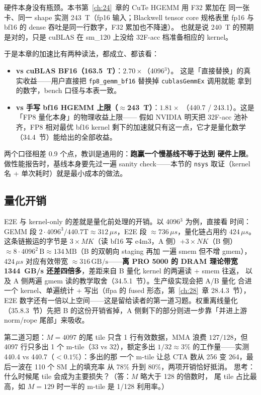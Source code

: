 硬件本身没有瓶颈。本书第~\ref{ch:24}~章的 CuTe HGEMM 用 F32 累加在
同一张卡、同一 shape 实测 243~T（fp16 输入；Blackwell tensor core
规格表里 fp16 与 bf16 的 dense 吞吐是同一行数字，F32 累加也不降速）。
也就是说 240~T 的预期是对的，只是 cuBLAS 在 sm\_120 上没给 32F-acc
档准备相应的 kernel。

于是本章的加速比有两种读法，都成立、都该看：

\begin{itemize}[itemsep=1pt,topsep=2pt]
  \item \textbf{vs cuBLAS BF16（163.5~T）}：$2.70\times$（4096$^3$）。
        这是「直接替换」的真实收益——用户直接把
        \texttt{fp8\_gemm\_bf16} 替换掉 \texttt{cublasGemmEx} 调用就能
        拿到的数字，bench 口径与本表一致。
  \item \textbf{vs 手写 bf16 HGEMM 上限（$\approx$243~T）}：$1.81\times$
        （440.7 / 243.1）。这是「FP8 量化本身」的物理收益上限——
        假如 NVIDIA 明天把 32F-acc 池补齐，FP8 相对最优 bf16 kernel
        剩下的加速就只有这一点，它才是量化数学（34.4~节）能给出的全部收益。
\end{itemize}

两个口径相差 0.9 个点，教训是通用的：\textbf{跑赢一个慢基线不等于达到
硬件上限}。做性能报告时，基线本身要先过一遍 sanity check——本节的
\texttt{nsys} 取证（kernel 名 + 单次耗时）就是最小成本的做法。

\subsection{量化开销}

E2E 与 kernel-only 的差就是量化前处理的开销。以 4096$^3$ 为例，直接看
时间：GEMM 段
$2\cdot4096^3/440.7\mathrm{T}\approx 312\,\mu s$，E2E 段
$\approx 736\,\mu s$，量化链占用约 $424\,\mu s$。这条链搬运的字节是
$3\times MK$（读 bf16 写 e4m3，A 侧）$+3\times NK$（B 侧）$\approx
8\cdot 4096^2\,\text{B}\approx 134\,\text{MB}$（B 的双朝向 staging 再加
一遍 smem 但不增 gmem），$424\,\mu s$ 对应有效带宽
$\approx 316\,\text{GB/s}$——\textbf{离 PRO 5000 的 DRAM 理论带宽
1344~GB/s 还差四倍多}，差距来自 B 量化 kernel 的两遍读 + smem 往返，
以及 A 侧两遍 gmem 读的教学取舍（34.5.1~节）。生产级实现会把 A/B 量化
合进一个 kernel、单遍统计 + 写出（ffpa 的 fused 形态，第~\ref{ch:28}~章
28.4.3~节），
E2E 数字还有一倍以上空间——这是留给读者的第一道习题。权重离线量化
（35.8.3~节）先把 B 的这份开销省掉，A 侧剩下的部分则进一步靠「并进上游
norm/rope 尾部」来吸收。

第二道习题：$M{=}4097$ 的尾 tile 只含 1 行有效数据，MMA 浪费
$127/128$，但 4097 行只多出 1 个 m-tile（33 vs 32），额定多出
$1/32\approx 3\%$ 的工作量——实测 440.4 vs 440.7（$<0.1\%$）：多出的那
一个 m-tile 让总 CTA 数从 256 变 264，最后一波在 110 个 SM 上的填充率
从 78\% 升到 80\%，两项开销恰好抵消。
思考：什么时候尾 tile 会成为主要损失？（答：$M$ 略大于 128 的倍数时，
尾 tile 占比最高，如 $M{=}129$ 时一半的 m-tile 是 1/128 利用率。）

